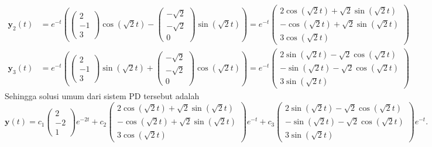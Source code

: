 \documentclass[a4paper]{article}
\theoremstyle{definisi}
\numberwithin{equation}{section}
\begin{document}
\begin{enumerate}
\begin{align*}
      \mathbf{y}_2(t) &= e^{-t}\left(\begin{pmatrix}2\\-1\\3\end{pmatrix}\cos(\sqrt{2}t) - \begin{pmatrix}-\sqrt{2}\\-\sqrt{2}\\0\end{pmatrix}\sin(\sqrt{2}t)\right)=e^{-t}\begin{pmatrix}2\cos(\sqrt{2}t)+\sqrt{2}\sin(\sqrt{2}t)\\-\cos(\sqrt{2}t)+\sqrt{2}\sin(\sqrt{2}t)\\3\cos(\sqrt{2}t)\end{pmatrix}\\
      \mathbf{y}_3(t) &= e^{-t}\left(\begin{pmatrix}2\\-1\\3\end{pmatrix}\sin(\sqrt{2}t) + \begin{pmatrix}-\sqrt{2}\\-\sqrt{2}\\0\end{pmatrix}\cos(\sqrt{2}t)\right)=e^{-t}\begin{pmatrix}2\sin(\sqrt{2}t)-\sqrt{2}\cos(\sqrt{2}t)\\-\sin(\sqrt{2}t)-\sqrt{2}\cos(\sqrt{2}t)\\3\sin(\sqrt{2}t)\end{pmatrix}
    \end{align*} 
    Sehingga solusi umum dari sistem PD tersebut adalah
    \[\mathbf{y}(t) = c_1\begin{pmatrix}2\\-2\\1\end{pmatrix}e^{-2t} + c_2\begin{pmatrix}2\cos(\sqrt{2}t)+\sqrt{2}\sin(\sqrt{2}t)\\-\cos(\sqrt{2}t)+\sqrt{2}\sin(\sqrt{2}t)\\3\cos(\sqrt{2}t)\end{pmatrix}e^{-t} + c_3\begin{pmatrix}2\sin(\sqrt{2}t)-\sqrt{2}\cos(\sqrt{2}t)\\-\sin(\sqrt{2}t)-\sqrt{2}\cos(\sqrt{2}t)\\3\sin(\sqrt{2}t)\end{pmatrix}e^{-t}.\]


\end{enumerate}
\end{document}
